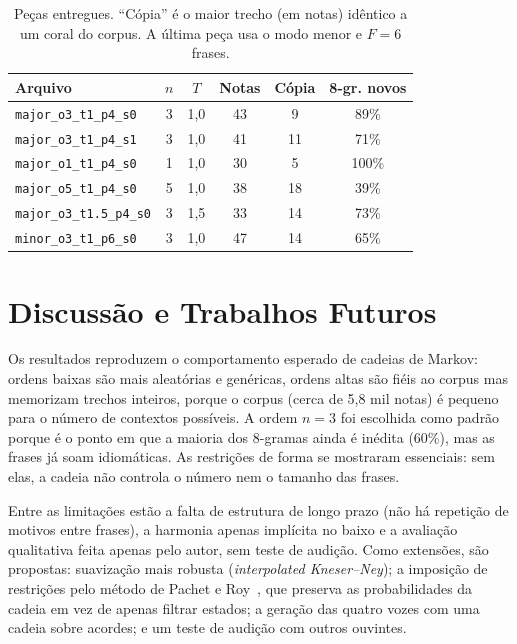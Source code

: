 \documentclass{article}
\begin{document}
\begin{table}[t]
  \centering
  \footnotesize
  \setlength{\tabcolsep}{4pt}
  \begin{tabular}{@{}lccccc@{}}
    \toprule
    Arquivo & $n$ & $T$ & Notas & Cópia & 8-gr. novos \\
    \midrule
    \texttt{major\_o3\_t1\_p4\_s0}   & 3 & 1,0 & 43 & 9  & 89\% \\
    \texttt{major\_o3\_t1\_p4\_s1}   & 3 & 1,0 & 41 & 11 & 71\% \\
    \texttt{major\_o1\_t1\_p4\_s0}   & 1 & 1,0 & 30 & 5  & 100\% \\
    \texttt{major\_o5\_t1\_p4\_s0}   & 5 & 1,0 & 38 & 18 & 39\% \\
    \texttt{major\_o3\_t1.5\_p4\_s0} & 3 & 1,5 & 33 & 14 & 73\% \\
    \texttt{minor\_o3\_t1\_p6\_s0}   & 3 & 1,0 & 47 & 14 & 65\% \\
    \bottomrule
  \end{tabular}
  \caption{Peças entregues. ``Cópia'' é o maior trecho (em notas) idêntico a um coral do corpus. A última peça usa o modo menor e $F=6$ frases.}
  \label{tab:samples}
\end{table}

\section{Discussão e Trabalhos Futuros}\label{sec:discussao}

Os resultados reproduzem o comportamento esperado de cadeias de Markov: ordens baixas são mais aleatórias e genéricas, ordens altas são fiéis ao corpus mas memorizam trechos inteiros, porque o corpus (cerca de 5,8 mil notas) é pequeno para o número de contextos possíveis. A ordem $n=3$ foi escolhida como padrão porque é o ponto em que a maioria dos 8-gramas ainda é inédita (60\%), mas as frases já soam idiomáticas. As restrições de forma se mostraram essenciais: sem elas, a cadeia não controla o número nem o tamanho das frases.

Entre as limitações estão a falta de estrutura de longo prazo (não há repetição de motivos entre frases), a harmonia apenas implícita no baixo e a avaliação qualitativa feita apenas pelo autor, sem teste de audição. Como extensões, são propostas: suavização mais robusta (\emph{interpolated Kneser--Ney}); a imposição de restrições pelo método de Pachet e Roy~\cite{pachet2011}, que preserva as probabilidades da cadeia em vez de apenas filtrar estados; a geração das quatro vozes com uma cadeia sobre acordes; e um teste de audição com outros ouvintes.


\end{document}
